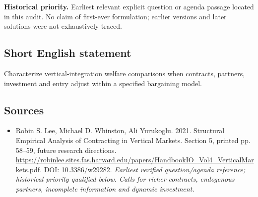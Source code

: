 \documentclass[11pt]{article}
\begin{document}
\par\textbf{Historical priority.} Earliest relevant explicit question or agenda passage located in this audit. No claim of first-ever formulation; earlier versions and later solutions were not exhaustively traced.

\subsection{Short English statement}
Characterize vertical-integration welfare comparisons when contracts, partners, investment and entry adjust within a specified bargaining model.

\subsection{Sources}
\begin{itemize}\raggedright
\item[\textnormal{[S1]}]\hypertarget{source:30007678:1}{} Robin S. Lee, Michael D. Whinston, Ali Yurukoglu. 2021. Structural Empirical Analysis of Contracting in Vertical Markets. Section 5, printed pp. 58–59, future research directions.
\url{https://robinlee.sites.fas.harvard.edu/papers/HandbookIO_Vol4_VerticalMarkets.pdf}.
DOI: 10.3386/w29282.
{\small\textit{Earliest verified question/agenda reference; historical priority qualified below. Calls for richer contracts, endogenous partners, incomplete information and dynamic investment.}}
\end{itemize}
\end{document}
